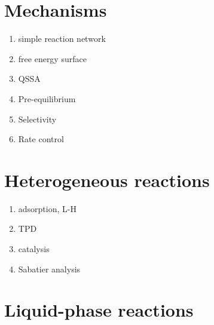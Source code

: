 \documentclass[11pt]{article}
\begin{document}
\section{Mechanisms}
\label{sec:orgcacd694}
\begin{enumerate}
\item simple reaction network
\item free energy surface
\item QSSA
\item Pre-equilibrium
\item Selectivity
\item Rate control
\end{enumerate}

\section{Heterogeneous reactions}
\label{sec:org7a73fc3}
\begin{enumerate}
\item adsorption, L-H
\item TPD
\item catalysis
\item Sabatier analysis
\end{enumerate}

\section{Liquid-phase reactions}
\label{sec:org2f795da}
\end{document}
